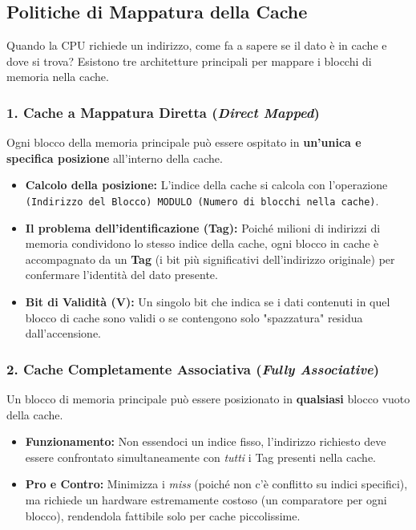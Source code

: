 \documentclass[12pt, a4paper]{article}
\begin{document}
\subsection{Politiche di Mappatura della Cache}
Quando la CPU richiede un indirizzo, come fa a sapere se il dato è in cache e dove si trova? Esistono tre architetture principali per mappare i blocchi di memoria nella cache.

\subsubsection{1. Cache a Mappatura Diretta (\textit{Direct Mapped})}
Ogni blocco della memoria principale può essere ospitato in \textbf{un'unica e specifica posizione} all'interno della cache.
\begin{itemize}
    \item \textbf{Calcolo della posizione:} L'indice della cache si calcola con l'operazione \texttt{(Indirizzo del Blocco) MODULO (Numero di blocchi nella cache)}.
    \item \textbf{Il problema dell'identificazione (Tag):} Poiché milioni di indirizzi di memoria condividono lo stesso indice della cache, ogni blocco in cache è accompagnato da un \textbf{Tag} (i bit più significativi dell'indirizzo originale) per confermare l'identità del dato presente.
    \item \textbf{Bit di Validità (V):} Un singolo bit che indica se i dati contenuti in quel blocco di cache sono validi o se contengono solo "spazzatura" residua dall'accensione.
\end{itemize}

\subsubsection{2. Cache Completamente Associativa (\textit{Fully Associative})}
Un blocco di memoria principale può essere posizionato in \textbf{qualsiasi} blocco vuoto della cache.
\begin{itemize}
    \item \textbf{Funzionamento:} Non essendoci un indice fisso, l'indirizzo richiesto deve essere confrontato simultaneamente con \textit{tutti} i Tag presenti nella cache.
    \item \textbf{Pro e Contro:} Minimizza i \textit{miss} (poiché non c'è conflitto su indici specifici), ma richiede un hardware estremamente costoso (un comparatore per ogni blocco), rendendola fattibile solo per cache piccolissime.
\end{itemize}
\end{document}

